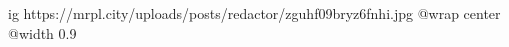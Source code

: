  
 
 
 
 

\ifcmt
  ig https://mrpl.city/uploads/posts/redactor/zguhf09bryz6fnhi.jpg
  @wrap center
  @width 0.9
\fi
